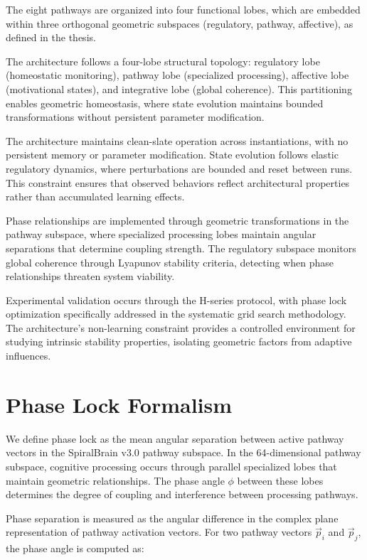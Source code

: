 \documentclass[12pt,a4paper]{article}
\begin{document}
The eight pathways are organized into four functional lobes, which are embedded within three orthogonal geometric subspaces (regulatory, pathway, affective), as defined in the thesis.

The architecture follows a four-lobe structural topology: regulatory lobe (homeostatic monitoring), pathway lobe (specialized processing), affective lobe (motivational states), and integrative lobe (global coherence). This partitioning enables geometric homeostasis, where state evolution maintains bounded transformations without persistent parameter modification.

The architecture maintains clean-slate operation across instantiations, with no persistent memory or parameter modification. State evolution follows elastic regulatory dynamics, where perturbations are bounded and reset between runs. This constraint ensures that observed behaviors reflect architectural properties rather than accumulated learning effects.

Phase relationships are implemented through geometric transformations in the pathway subspace, where specialized processing lobes maintain angular separations that determine coupling strength. The regulatory subspace monitors global coherence through Lyapunov stability criteria, detecting when phase relationships threaten system viability.

Experimental validation occurs through the H-series protocol, with phase lock optimization specifically addressed in the systematic grid search methodology. The architecture's non-learning constraint provides a controlled environment for studying intrinsic stability properties, isolating geometric factors from adaptive influences.

\section{Phase Lock Formalism}

We define phase lock as the mean angular separation between active pathway vectors in the SpiralBrain v3.0 pathway subspace. In the 64-dimensional pathway subspace, cognitive processing occurs through parallel specialized lobes that maintain geometric relationships. The phase angle $\phi$ between these lobes determines the degree of coupling and interference between processing pathways.

Phase separation is measured as the angular difference in the complex plane representation of pathway activation vectors. For two pathway vectors $\vec{p}_i$ and $\vec{p}_j$, the phase angle is computed as:
\end{document}
